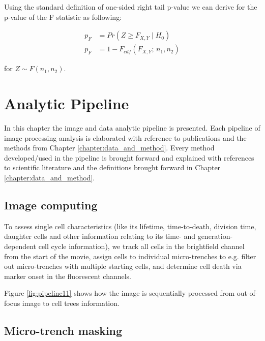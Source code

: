 \documentclass[pdftex,12pt,a4paper]{report}
\begin{document}
Using the  standard definition of one-sided right tail p-value we can derive for the p-value of the F statistic as following:

\begin{align}
  p_F &= Pr(Z \geq F_{X,Y} \mid H_0) \nonumber \\
  p_F &= 1 - F_{cdf}(F_{X,Y}; \, n_1, n_2)\label{eq:ftest_pval}
\end{align}

for $Z \sim F(n_1, n_2)$.

\chapter{Analytic Pipeline}
\label{chapter:analytic_pipeline}

In this chapter the image and data analytic pipeline is presented. Each pipeline of image processing analysis is elaborated with reference to publications and the methods from Chapter \ref{chapter:data_and_method}.
Every method developed/used in the pipeline is brought forward and explained with references to scientific literature and the definitions brought forward in Chapter \ref{chapter:data_and_method}.

\section{Image computing}

To assess single cell characteristics (like its lifetime, time-to-death, division time, daughter cells and other information relating to its time- and generation-dependent cell cycle information), we track all cells in the brightfield channel from the start of the movie, assign cells to individual micro-trenches to e.g. filter out micro-trenches with multiple starting cells, and determine cell death via marker onset in the fluorescent channels.

Figure \ref{fig:pipeline11} shows how the image is sequentially processed from out-of-focus image to cell trees information.

\section{Micro-trench masking}
\label{subsection:micro_trench_masking}
\end{document}
